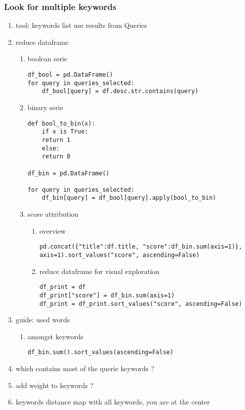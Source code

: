 \documentclass[11pt]{article}
\begin{document}
\subsubsection{Look for multiple keywords}
\label{sec:org593843e}
\begin{enumerate}
\item tool: keywords list
\label{sec:orge76e20e}
use results from Queries
\item reduce dataframe
\label{sec:org4bdc84d}
\begin{enumerate}
\item boolean serie
\label{sec:org5cebe69}
\begin{verbatim}
df_bool = pd.DataFrame()
for query in queries_selected:
    df_bool[query] = df.desc.str.contains(query)
\end{verbatim}

\item binary serie
\label{sec:org1f7f9fb}
\begin{verbatim}
def bool_to_bin(x):
    if x is True:
	return 1
    else:
	return 0

df_bin = pd.DataFrame()

for query in queries_selected:
    df_bin[query] = df_bool[query].apply(bool_to_bin)
\end{verbatim}

\item score attribution
\label{sec:orgd11d3a6}

\begin{enumerate}
\item overview
\label{sec:org91f5757}
\begin{verbatim}
pd.concat({"title":df.title, "score":df_bin.sum(axis=1)}, axis=1).sort_values("score", ascending=False)
\end{verbatim}

\item reduce dataframe for visual exploration
\label{sec:org8401a16}
\begin{verbatim}
df_print = df
df_print["score"] = df_bin.sum(axis=1)
df_print = df_print.sort_values("score", ascending=False)
\end{verbatim}
\end{enumerate}
\end{enumerate}

\item guide: used words
\label{sec:org34dc34d}
\begin{enumerate}
\item amongst keywords
\label{sec:org64a2567}
\begin{verbatim}
df_bin.sum().sort_values(ascending=False)
\end{verbatim}
\end{enumerate}

\item which contains most of the querie keywords ?
\label{sec:org4a2b941}
\item add weight to keywords ?
\label{sec:org865ec73}
\item keywords distance map
\label{sec:orgbddaa07}
with all keywords, you are at the center
\end{enumerate}
\end{document}
